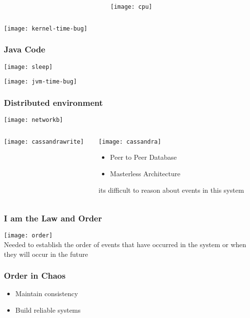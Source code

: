 \documentclass[aspectratio=169, 15pt,usenames,dvipsnames]{beamer}
\begin{document}
{\begin{gdblank}
\begin{columns}
\begin{column}{0.5\textwidth}
			\end{column}
			\pause
			\begin{column}{0.5\textwidth}
				\texttt{[image: cpu]}
			\end{column}
		\end{columns}				
	\end{gdblank}  
	\begin{gdblank}		
		\texttt{[image: kernel-time-bug]}
	\end{gdblank}  
	\begin{gdblank}		
		\frametitle{Java Code}
		\texttt{[image: sleep]}
	\end{gdblank}   
	\begin{gdblank}
		\texttt{[image: jvm-time-bug]}
	\end{gdblank}
	\begin{gdblank}
		\frametitle{Distributed environment}
		\texttt{[image: networkb]}
	\end{gdblank}   
	\begin{gdblank}
		\begin{columns}
			\begin{column}{0.6\textwidth}
				\texttt{[image: cassandrawrite]}
			\end{column}
			\begin{column}{0.4\textwidth}
				\texttt{[image: cassandra]}
				\centering
				\begin{itemize}
					\item Peer to Peer Database
					\item Masterless Architecture
				\end{itemize}
				\tiny its difficult to reason about events in this system
			\end{column}
		\end{columns}
	\end{gdblank}   
	\begin{gdblank}
		\frametitle{I am the Law and Order}
		\centering
		\texttt{[image: order]}
		\\Needed to establish the order of events that have occurred in the system or when they will occur in the future
	\end{gdblank}
	\begin{gdblank}
		\frametitle{Order in Chaos}
		\LARGE
		\begin{itemize}
			\item Maintain consistency
			\item Build reliable systems

\end{itemize}
\end{gdblank}}
\end{document}
